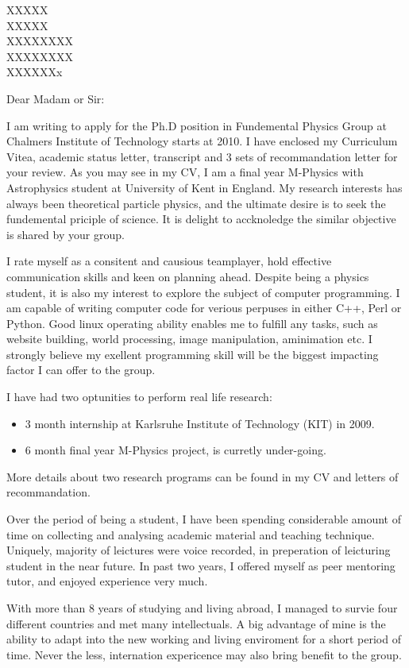 \documentclass[a4,12pt]{letter}
\begin{document}
\begin{letter}{XXXXX \\ XXXXX \\ XXXXXXXX \\ XXXXXXXX \\ XXXXXXx}
\opening{Dear Madam or Sir:}

I am writing to apply for the Ph.D position in Fundemental Physics Group at Chalmers Institute of Technology starts at 2010. I have enclosed my Curriculum Vitea, academic status letter, transcript and 3 sets of recommandation letter for your review. 
As you may see in my CV, I am a final year M-Physics with Astrophysics student at University of Kent in England. My research interests has always been theoretical particle physics, and the ultimate desire is to seek the fundemental priciple of science. It is delight to accknoledge the similar objective is shared by your group.   

I rate myself as a consitent and causious teamplayer, hold effective communication skills and keen on planning ahead. Despite being a physics student, it is also my interest to explore the subject of computer programming. I am capable of writing computer code for verious perpuses in either C++, Perl or Python. Good linux operating ability enables me to fulfill any tasks, such as website building, world processing, image manipulation, aminimation etc. I strongly believe my exellent programming skill will be the biggest impacting factor I can offer to the group. 

I have had two optunities to perform real life research:
\begin{itemize}
\item 3 month internship at Karlsruhe Institute of Technology (KIT) in 2009. 
\item 6 month final year M-Physics project, is curretly under-going.
\end{itemize}
More details about two research programs can be found in my CV and letters of recommandation.

Over the period of being a student, I have been spending considerable amount of time on collecting and analysing academic material and teaching technique. Uniquely, majority of leictures were voice recorded, in preperation of leicturing student in the near future. In past two years, I offered myself as peer mentoring tutor, and enjoyed experience very much. 

With more than 8 years of studying and living abroad, I managed to survie four different countries and met many intellectuals. A big advantage of mine is the ability to adapt into the new working and living enviroment for a short period of time. Never the less, internation expericence may also bring benefit to the group.


\end{letter}
\end{document}

